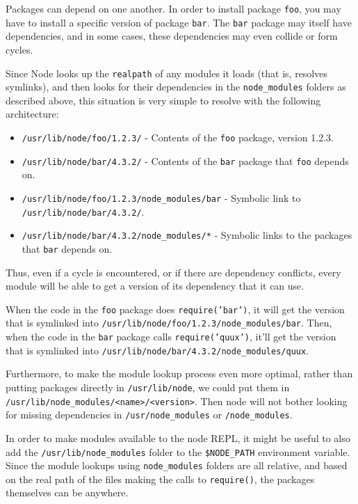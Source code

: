 Packages can depend on one another. In order to install package
\texttt{foo}, you may have to install a specific version of package
\texttt{bar}. The \texttt{bar} package may itself have dependencies, and
in some cases, these dependencies may even collide or form cycles.

Since Node looks up the \texttt{realpath} of any modules it loads (that
is, resolves symlinks), and then looks for their dependencies in the
\texttt{node\_modules} folders as described above, this situation is
very simple to resolve with the following architecture:

\begin{itemize}
\itemsep1pt\parskip0pt
\item
  \texttt{/usr/lib/node/foo/1.2.3/} - Contents of the \texttt{foo}
  package, version 1.2.3.
\item
  \texttt{/usr/lib/node/bar/4.3.2/} - Contents of the \texttt{bar}
  package that \texttt{foo} depends on.
\item
  \texttt{/usr/lib/node/foo/1.2.3/node\_modules/bar} - Symbolic link to
  \texttt{/usr/lib/node/bar/4.3.2/}.
\item
  \texttt{/usr/lib/node/bar/4.3.2/node\_modules/*} - Symbolic links to
  the packages that \texttt{bar} depends on.
\end{itemize}

Thus, even if a cycle is encountered, or if there are dependency
conflicts, every module will be able to get a version of its dependency
that it can use.

When the code in the \texttt{foo} package does \texttt{require('bar')},
it will get the version that is symlinked into
\texttt{/usr/lib/node/foo/1.2.3/node\_modules/bar}. Then, when the code
in the \texttt{bar} package calls \texttt{require('quux')}, it'll get
the version that is symlinked into
\texttt{/usr/lib/node/bar/4.3.2/node\_modules/quux}.

Furthermore, to make the module lookup process even more optimal, rather
than putting packages directly in \texttt{/usr/lib/node}, we could put
them in
\texttt{/usr/lib/node\_modules/\textless{}name\textgreater{}/\textless{}version\textgreater{}}.
Then node will not bother looking for missing dependencies in
\texttt{/usr/node\_modules} or \texttt{/node\_modules}.

In order to make modules available to the node REPL, it might be useful
to also add the \texttt{/usr/lib/node\_modules} folder to the
\texttt{\$NODE\_PATH} environment variable. Since the module lookups
using \texttt{node\_modules} folders are all relative, and based on the
real path of the files making the calls to \texttt{require()}, the
packages themselves can be anywhere.
